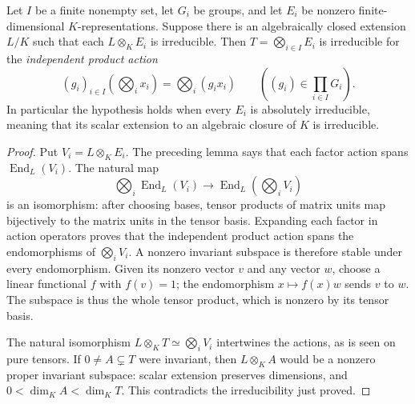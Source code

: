 \begin{lemma}
\label{lem:independent-product-irreducible}
\leanok
Let $I$ be a finite nonempty set, let $G_i$ be groups, and let $E_i$ be
nonzero finite-dimensional $K$-representations. Suppose there is an
algebraically closed extension $L/K$ such that each $L\otimes_K E_i$ is
irreducible. Then $T=\bigotimes_{i\in I}E_i$ is irreducible for the
\emph{independent product action}
\[
 (g_i)_{i\in I}\left(\bigotimes_i x_i\right)=\bigotimes_i(g_i x_i)
 \qquad\left((g_i)\in\prod_{i\in I}G_i\right).
\]
In particular the hypothesis holds when every $E_i$ is absolutely
irreducible, meaning that its scalar extension to an algebraic closure
of $K$ is irreducible.
\end{lemma}
\begin{proof}
Put $V_i=L\otimes_K E_i$. The preceding lemma says that each factor
action spans $\operatorname{End}_L(V_i)$. The natural map
\[
 \bigotimes_i\operatorname{End}_L(V_i)
       \longrightarrow\operatorname{End}_L\left(\bigotimes_i V_i\right)
\]
is an isomorphism: after choosing bases, tensor products of matrix units
map bijectively to the matrix units in the tensor basis. Expanding each
factor in action operators proves that the independent product action
spans the endomorphisms of $\bigotimes_i V_i$. A nonzero invariant
subspace is therefore stable under every endomorphism. Given its nonzero
vector $v$ and any vector $w$, choose a linear functional $f$ with
$f(v)=1$; the endomorphism $x\mapsto f(x)w$ sends $v$ to $w$.
The subspace is thus the whole tensor product, which is nonzero by its
tensor basis.

The natural isomorphism $L\otimes_K T\simeq\bigotimes_i V_i$ intertwines
the actions, as is seen on pure tensors. If $0\ne A\subsetneq T$ were
invariant, then $L\otimes_K A$ would be a nonzero proper invariant
subspace: scalar extension preserves dimensions, and
$0<\dim_K A<\dim_K T$. This contradicts the irreducibility just proved.
\end{proof}

